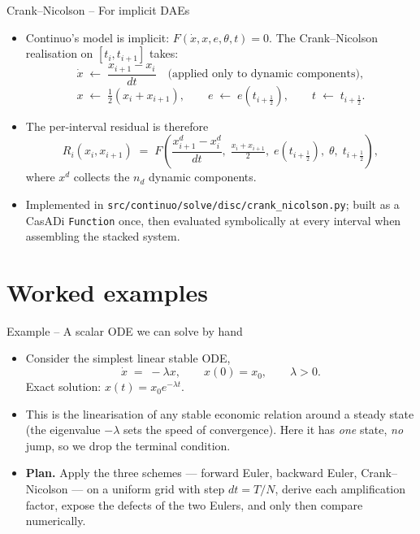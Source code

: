\documentclass[11pt,aspectratio=169]{beamer}
\begin{document}
\begin{frame}{Crank--Nicolson -- For implicit DAEs}

\begin{itemize}

\item Continuo's model is implicit: $F(\dot x,x,e,\theta,t)=0$.
  The Crank--Nicolson realisation on $[t_i,t_{i+1}]$ takes:
  \[
  \dot x \;\leftarrow\; \frac{x_{i+1}-x_i}{dt}
  \quad\text{(applied only to dynamic components)},
  \]
  \[
  x \;\leftarrow\; \tfrac12(x_i+x_{i+1}),
  \qquad
  e \;\leftarrow\; e(t_{i+\frac12}),
  \qquad
  t \;\leftarrow\; t_{i+\frac12}.
  \]

\item The per-interval residual is therefore
  \[
  R_i(x_i,x_{i+1})
  \;=\;
  F\!\left(\frac{x_{i+1}^d-x_i^d}{dt},\;
           \tfrac{x_i+x_{i+1}}{2},\;
           e(t_{i+\frac12}),\;\theta,\;
           t_{i+\frac12}\right),
  \]
  where $x^d$ collects the $n_d$ dynamic components.\newline

\item Implemented in \texttt{src/continuo/solve/disc/crank\_nicolson.py};
  built as a CasADi \texttt{Function} once, then evaluated symbolically
  at every interval when assembling the stacked system.

\end{itemize}

\end{frame}

\section{Worked examples}

\begin{frame}{Example -- A scalar ODE we can solve by hand}

\begin{itemize}

\item Consider the simplest linear stable ODE,
  \[
  \dot x \;=\; -\lambda x,
  \qquad x(0) = x_0,
  \qquad \lambda > 0.
  \]
  Exact solution: $x(t) = x_0 e^{-\lambda t}$.\newline

\item This is the linearisation of any stable economic relation
  around a steady state (the eigenvalue $-\lambda$ sets the speed of
  convergence). Here it has \emph{one} state, \emph{no} jump, so we
  drop the terminal condition.\newline

\item \textbf{Plan.} Apply the three schemes — forward Euler,
  backward Euler, Crank--Nicolson — on a uniform grid with step
  $dt = T/N$, derive each amplification factor, expose the defects
  of the two Eulers, and only then compare numerically.

\end{itemize}

\end{frame}
\end{document}
